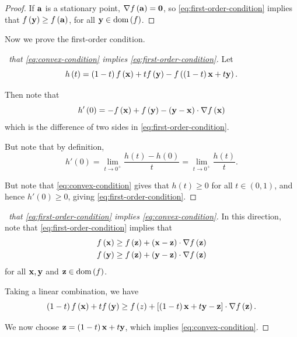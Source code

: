 \documentclass[11pt]{article}
\numberwithin{equation}{section}
\theoremstyle{definition}
\theoremstyle{remark}
\newcommand{\pqty}[1]{\left(#1\right)}
\newcommand{\bqty}[1]{\left[#1\right]}
\newcommand{\oointv}[2]{(#1,#2)}
\newcommand{\grad}{\nabla}
\newcommand{\vdot}{\cdot}
\DeclareMathOperator{\dom}{dom}
\begin{document}
\begin{proof}
    If \(\vb{a}\) is a stationary point, \(\grad f\pqty{\vb{a}} = \vb{0}\), so \autoref{eq:first-order-condition} implies that \(f\pqty{\vb{y}} \geq f\pqty{\vb{a}}\), for all \(\vb{y} \in \dom\pqty{f}\).
\end{proof}

Now we prove the first-order condition.

\begin{proof}[\proofname\ that \autoref{eq:convex-condition} implies \autoref{eq:first-order-condition}]
    Let
    \[
        h\pqty{t} = \pqty{1 - t} f\pqty{\vb{x}} + t f\pqty{\vb{y}} - f\pqty{\pqty{1 - t} \vb{x} + t \vb{y}}.
    \]

    Then note that
    \[
        h'\pqty{0} = - f\pqty{\vb{x}} + f\pqty{\vb{y}} - \pqty{\vb{y} - \vb{x}} \vdot \grad f\pqty{\vb{x}}
    \]
    which is the difference of two sides in \autoref{eq:first-order-condition}.

    But note that by definition,
    \[
        h'\pqty{0} = \lim_{t \to 0^+} \frac{h\pqty{t} - h\pqty{0}}{t} = \lim_{t \to 0^+} \frac{h\pqty{t}}{t}.
    \]

    But note that \autoref{eq:convex-condition} gives that \(h\pqty{t} \geq 0\) for all \(t \in \oointv{0}{1}\), and hence \(h'\pqty{0} \geq 0\), giving \autoref{eq:first-order-condition}.
 
\end{proof}

\begin{proof}[\proofname\ that \autoref{eq:first-order-condition} implies \autoref{eq:convex-condition}]
    In this direction, note that \autoref{eq:first-order-condition} implies that
    \begin{align*}
        f\pqty{\vb{x}} &\geq f\pqty{\vb{z}} + \pqty{\vb{x} - \vb{z}} \vdot \grad f\pqty{\vb{z}} \\
        f\pqty{\vb{y}} &\geq f\pqty{\vb{z}} + \pqty{\vb{y} - \vb{z}} \vdot \grad f\pqty{\vb{z}}
    \end{align*}
    for all \(\vb{x}, \vb{y}\) and \(\vb{z} \in \dom\pqty{f}\).

    Taking a linear combination, we have
    \[
        \pqty{1 - t} f\pqty{\vb{x}} + t f \pqty{\vb{y}} \geq f\pqty{z} + \bqty{\pqty{1 - t} \vb{x} + t \vb{y} - \vb{z}} \vdot \grad f\pqty{\vb{z}}.
    \]

    We now choose \(\vb{z} = \pqty{1 - t} \vb{x} + t \vb{y}\), which implies \autoref{eq:convex-condition}.
\end{proof}
\end{document}
